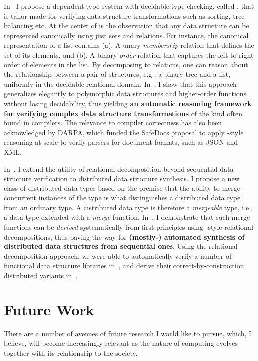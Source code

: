 In~\cite{icfp14} I propose a dependent type system with decidable type
checking, called \catalyst, that is tailor-made for verifying data
structure transformations such as sorting, tree balancing etc. At the
center of \catalyst is the observation that any data structure can be
represented canonically using just sets and relations. For instance,
the canonical representation of a list contains (a). A unary
\emph{membership} relation that defines the set of its elements, and
(b). A binary \emph{order} relation that captures the left-to-right
order of elements in the list. By decomposing to relations, one can
reason about the relationship between a pair of structures, e.g., a
binary tree and a list, uniformly in the decidable relational domain.
In~\cite{icfp14}, I show that this approach generalizes elegantly to
polymorphic data structures and higher-order functions without losing
decidability, thus yielding \textbf{an automatic reasoning framework for
verifying complex data structure transformations} of the kind often
found in compilers. The relevance to compiler correctness has also
been acknowledged by DARPA, which funded the SafeDocs proposal to
apply \catalyst-style reasoning at scale to verify parsers for
document formats, such as JSON and XML.

In~\cite{oopsla19}, I extend the utility of relational decomposition
beyond sequential data structure verification to distributed data
structure synthesis. I propose a new class of distributed data types
based on the premise that the ability to merge concurrent instances of
the type is what distinguishes a distributed data type from an
ordinary type.  A distributed data type is therefore a
\emph{mergeable} type, i.e., a data type extended with a \emph{merge}
function. In~\cite{oopsla19}, I demonstrate that such merge functions
can be \emph{derived} systematically from first principles using
\catalyst-style relational decompositions, thus paving the way for
\textbf{(mostly-) automated synthesis of distributed data structures
from sequential ones}. Using the relational decomposition approach, we
were able to automatically verify a number of functional data
structure libraries in~\cite{icfp14}, and derive their
correct-by-construction distributed variants in~\cite{oopsla19}.

\section*{Future Work}

There are a number of avenues of future research I would like to
pursue, which, I believe, will become increasingly relevant as the
nature of computing evolves together with its relationship to the
society. 

